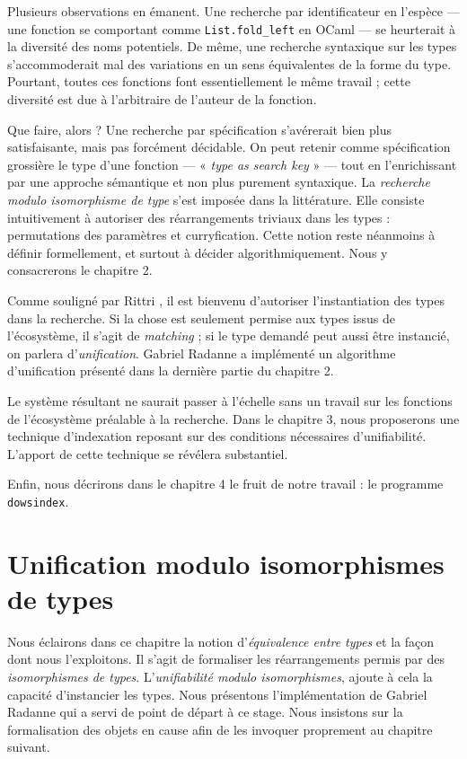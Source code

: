 \documentclass[a4paper]{report}
\theoremstyle{definition}
\newcommand{\dowsindex}{\texttt{dowsindex}\xspace}
\begin{document}
Plusieurs observations en émanent. Une recherche par identificateur en l'espèce — une fonction se comportant comme \texttt{List.fold\_left} en OCaml — se heurterait à la diversité des noms potentiels. De même, une recherche syntaxique sur les types s'accommoderait mal des variations en un sens équivalentes de la forme du type. Pourtant, toutes ces fonctions font essentiellement le même travail ; cette diversité est due à l'arbitraire de l'auteur de la fonction.

Que faire, alors ? Une recherche par spécification s'avérerait bien plus satisfaisante, mais pas forcément décidable. On peut retenir comme spécification grossière le type d'une fonction — « \textit{type as search key} » — tout en l'enrichissant par une approche sémantique et non plus purement syntaxique. La \textit{recherche modulo isomorphisme de type} s'est imposée dans la littérature. Elle consiste intuitivement à autoriser des réarrangements triviaux dans les types : permutations des paramètres et curryfication. Cette notion reste néanmoins à définir formellement, et surtout à décider algorithmiquement. Nous y consacrerons le chapitre 2.

Comme souligné par Rittri \cite{Rittri93}, il est bienvenu d'autoriser l'instantiation des types dans la recherche. Si la chose est seulement permise aux types issus de l'écosystème, il s'agit de \emph{matching} ; si le type demandé peut aussi être instancié, on parlera d'\emph{unification}. Gabriel Radanne a implémenté un algorithme d'unification présenté dans la dernière partie du chapitre 2.

Le système résultant ne saurait passer à l'échelle sans un travail sur les fonctions de l'écosystème préalable à la recherche. Dans le chapitre 3, nous proposerons une technique d'indexation reposant sur des conditions nécessaires d'unifiabilité. L'apport de cette technique se révélera substantiel.

Enfin, nous décrirons dans le chapitre 4 le fruit de notre travail : le programme \dowsindex.


\chapter{Unification modulo isomorphismes de types}

Nous éclairons dans ce chapitre la notion d'\emph{équivalence entre types} et la façon dont nous l'exploitons. Il s'agit de formaliser les réarrangements permis par des \emph{isomorphismes de types}. L'\emph{unifiabilité modulo isomorphismes}, ajoute à cela la capacité d'instancier les types. Nous présentons l'implémentation de Gabriel Radanne qui a servi de point de départ à ce stage. Nous insistons sur la formalisation des objets en cause afin de les invoquer proprement au chapitre suivant.
\end{document}
